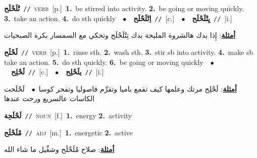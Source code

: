 \documentclass[10pt,a4paper,twoside]{article} %
\begin{document}
\begin{multicols}{2}
{\setlength\topsep{0pt}\textbf{\foreignlanguage{arabic}{تْلَحْلَح}}\ {\color{gray}\texttt{//}\color{black}}\ \textsc{verb}\ [p.]\ \textbf{1.}~be stirred into activity.  \textbf{2.}~be going or moving quickly.  \textbf{3.}~take an action.  \textbf{4.}~do sth quickly\ \ $\bullet$\ \ \setlength\topsep{0pt}\textbf{\foreignlanguage{arabic}{اِتْلَحْلَح}}\ {\color{gray}\texttt{//}\color{black}}\ [c.]\ \ $\bullet$\ \ \setlength\topsep{0pt}\textbf{\foreignlanguage{arabic}{يِتْلَحْلَح}}\ {\color{gray}\texttt{//}\color{black}}\ [i.]\  \begin{flushright}\color{gray}\foreignlanguage{arabic}{\textbf{\underline{\foreignlanguage{arabic}{أمثلة}}}: إِذا بدك هالشروة المليحة بدك تِتْلَحْلَح وتحكي مع السمسار بكرة الصبحيات}\end{flushright}\color{black}} \vspace{2mm}

{\setlength\topsep{0pt}\textbf{\foreignlanguage{arabic}{لَحْلَح}}\ {\color{gray}\texttt{//}\color{black}}\ \textsc{verb}\ [p.]\ \textbf{1.}~rinse sth.  \textbf{2.}~wash sth.  \textbf{3.}~stir sb into activity.  \textbf{4.}~make sb take an action.  \textbf{5.}~do sth quickly.  \textbf{6.}~be going or moving quickly\ \ $\bullet$\ \ \setlength\topsep{0pt}\textbf{\foreignlanguage{arabic}{لَحْلِح}}\ {\color{gray}\texttt{//}\color{black}}\ [c.]\ \ $\bullet$\ \ \setlength\topsep{0pt}\textbf{\foreignlanguage{arabic}{يلَحْلِح}}\ {\color{gray}\texttt{//}\color{black}}\ [i.]\  \begin{flushright}\color{gray}\foreignlanguage{arabic}{\textbf{\underline{\foreignlanguage{arabic}{أمثلة}}}: لَحْلِح مرتك وعلمها كيف تقمع باميا وتقرِّم فاصوليا وتفحر كوسا\ $\bullet$\ \  لَحْلَحت الكاسات عالسريع ورحت عندها}\end{flushright}\color{black}} \vspace{2mm}

{\setlength\topsep{0pt}\textbf{\foreignlanguage{arabic}{لَحْلَحِة}}\ {\color{gray}\texttt{//}\color{black}}\ \textsc{noun}\ [f.]\ \textbf{1.}~energy  \textbf{2.}~activity\ } \vspace{2mm}

{\setlength\topsep{0pt}\textbf{\foreignlanguage{arabic}{مْلَحْلَح}}\ {\color{gray}\texttt{//}\color{black}}\ \textsc{adj}\ [m.]\ \textbf{1.}~energetic  \textbf{2.}~active\  \begin{flushright}\color{gray}\foreignlanguage{arabic}{\textbf{\underline{\foreignlanguage{arabic}{أمثلة}}}: صلاح مْلَحْلَح وشغِّيل ما شاء الله}\end{flushright}\color{black}} \vspace{2mm}


\end{multicols}
\end{document}
